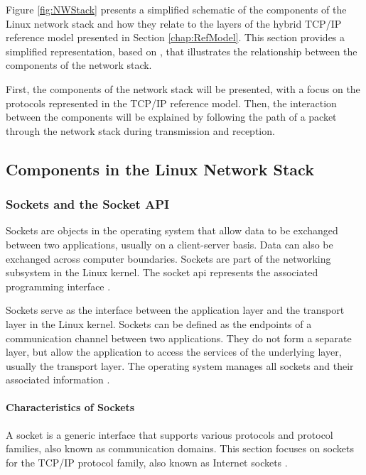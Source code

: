 Figure \ref{fig:NWStack} presents a simplified schematic of the components of the Linux network stack and how they relate to the layers of the hybrid TCP/IP reference model presented in Section \ref{chap:RefModel}. This section provides a simplified representation, based on \cite{lins06}, that illustrates the relationship between the components of the network stack. 

First, the components of the network stack will be presented, with a focus on the protocols represented in the TCP/IP reference model. Then, the interaction between the components will be explained by following the path of a packet through the network stack during transmission and reception.


\subsection{Components in the Linux Network Stack}

\subsubsection{Sockets and the Socket API}

Sockets are objects in the operating system that allow data to be exchanged between two applications, usually on a client-server basis. Data can also be exchanged across computer boundaries. Sockets are part of the networking subsystem in the Linux kernel. The socket \ac{api} represents the associated programming interface \cite{sock01}\cite{sock11}.

Sockets serve as the interface between the application layer and the transport layer in the Linux kernel. Sockets can be defined as the endpoints of a communication channel between two applications. They do not form a separate layer, but allow the application to access the services of the underlying layer, usually the transport layer. The operating system manages all sockets and their associated information \cite{sock02}.

\paragraph{Characteristics of Sockets}

A socket is a generic interface that supports various protocols and protocol families, also known as communication domains. This section focuses on sockets for the TCP/IP protocol family, also known as Internet sockets \cite{like03}.

